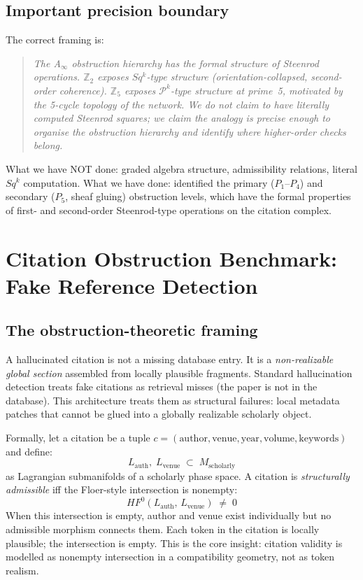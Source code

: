 \documentclass[11pt,a4paper]{article}
\begin{document}
\subsection*{Important precision boundary}

The correct framing is:

\begin{quote}
\emph{The A$_\infty$ obstruction hierarchy has the formal structure
of Steenrod operations.
$\mathbb{Z}_2$ exposes $Sq^k$-type structure (orientation-collapsed,
second-order coherence).
$\mathbb{Z}_5$ exposes $\mathcal{P}^k$-type structure at prime~5,
motivated by the 5-cycle topology of the network.
We do not claim to have literally computed Steenrod squares;
we claim the analogy is precise enough to organise the obstruction
hierarchy and identify where higher-order checks belong.}
\end{quote}

What we have NOT done: graded algebra structure, admissibility
relations, literal $Sq^k$ computation.
What we have done: identified the primary ($P_1$--$P_4$) and
secondary ($P_5$, sheaf gluing) obstruction levels, which have the
formal properties of first- and second-order Steenrod-type operations
on the citation complex.

\section{Citation Obstruction Benchmark: Fake Reference Detection}
\label{sec:citation}

\subsection{The obstruction-theoretic framing}

A hallucinated citation is not a missing database entry.
It is a \emph{non-realizable global section} assembled from locally
plausible fragments.
Standard hallucination detection treats fake citations as retrieval
misses (the paper is not in the database).
This architecture treats them as structural failures: local metadata
patches that cannot be glued into a globally realizable scholarly object.

Formally, let a citation be a tuple
$c = (\text{author}, \text{venue}, \text{year}, \text{volume}, \text{keywords})$
and define:
\[
  L_\text{auth},\; L_\text{venue} \;\subset\; M_\text{scholarly}
\]
as Lagrangian submanifolds of a scholarly phase space.
A citation is \emph{structurally admissible} iff the Floer-style
intersection is nonempty:
\[
  HF^0(L_\text{auth},\, L_\text{venue}) \;\neq\; 0
\]
When this intersection is empty, author and venue exist individually
but no admissible morphism connects them.
Each token in the citation is locally plausible; the intersection is empty.
This is the core insight: citation validity is modelled as nonempty
intersection in a compatibility geometry, not as token realism.
\end{document}
